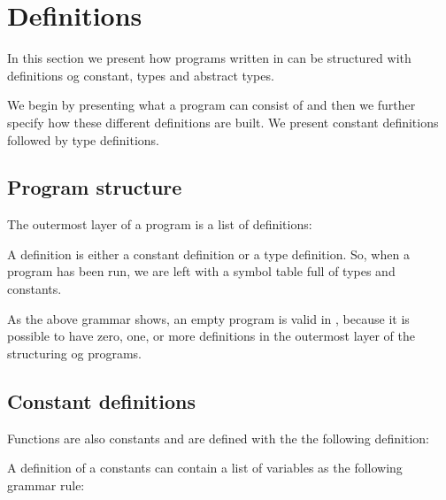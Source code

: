 \section{Definitions}
\label{sec:definitions}
In this section we present how programs written in \productname{} can be
structured with definitions og constant, types and abstract types.

We begin by presenting what a program can consist of and then we further specify
how these different definitions are built. We present constant definitions
followed by type definitions.

\subsection{Program structure}

The outermost layer of a \productname{} program is a list of definitions:

\begin{ebnf}
\end{ebnf}

A definition is either a constant definition or a type definition. So, when a
program has been run, we are left with a symbol table full of types and
constants.

As the above grammar shows, an empty program is valid in \productname{}, because
it is possible to have zero, one, or more definitions in the outermost layer of
the structuring og programs.

\subsection{Constant definitions}
\label{sec:constantdefinitions}

Functions are also constants and are defined with the the following definition:

\begin{ebnf}
\end{ebnf}

A definition of a constants can contain a list of variables as the following
grammar rule:

\begin{ebnf}
\end{ebnf}

